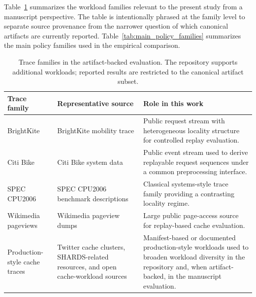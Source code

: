\documentclass[preprint,12pt]{elsarticle}
\begin{document}
Table~\ref{tab:trace_families} summarizes the workload families relevant to the present study from a manuscript perspective. The table is intentionally phrased at the family level to separate source provenance from the narrower question of which canonical artifacts are currently reported. Table~\ref{tab:main_policy_families} summarizes the main policy families used in the empirical comparison.

\begin{table}[!htbp]
\centering
\caption{Trace families in the artifact-backed evaluation. The repository supports additional workloads; reported results are restricted to the canonical artifact subset.}
\label{tab:trace_families}
\small
\begin{tabular}{p{2.8cm} p{4.3cm} p{5.0cm}}
\hline
\textbf{Trace family} & \textbf{Representative source} & \textbf{Role in this work} \\
\hline
BrightKite & BrightKite mobility trace \cite{cho2011friendship_mobility} & Public request stream with heterogeneous locality structure for controlled replay evaluation. \\
Citi Bike & Citi Bike system data \cite{citibike_system_data} & Public event stream used to derive replayable request sequences under a common preprocessing interface. \\
SPEC CPU2006 & SPEC CPU2006 benchmark descriptions \cite{henning2006spec_cpu2006} & Classical systems-style trace family providing a contrasting locality regime. \\
Wikimedia pageviews & Wikimedia pageview dumps \cite{wikimedia_pageviews} & Large public page-access source for replay-based cache evaluation. \\
Production-style cache traces & Twitter cache clusters, SHARDS-related resources, and open cache-workload sources \cite{yang2020twitter_cache_clusters,waldspurger2015shards,cachemon_open_source_cache_dataset,cachelib_cachebench_fb_hw_eval} & Manifest-based or documented production-style workloads used to broaden workload diversity in the repository and, when artifact-backed, in the manuscript evaluation. \\
\hline
\end{tabular}
\end{table}
\end{document}
